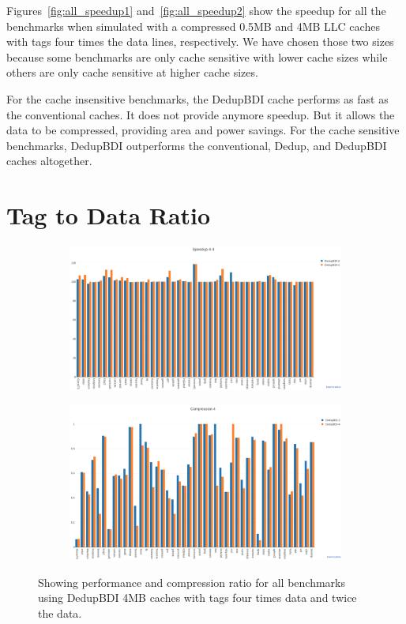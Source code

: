 Figures~\ref{fig:all_speedup1} and~\ref{fig:all_speedup2} show the speedup for all the benchmarks when simulated with a compressed 0.5MB and 4MB LLC caches with tags four times the data lines, respectively. We have chosen those two sizes because some benchmarks are only cache sensitive with lower cache sizes while others are only cache sensitive at higher cache sizes.\par
For the cache insensitive benchmarks, the DedupBDI cache performs as fast as the conventional caches. It does not provide anymore speedup. But it allows the data to be compressed, providing area and power savings. For the cache sensitive benchmarks, DedupBDI outperforms the conventional, Dedup, and DedupBDI caches altogether.

\section{Tag to Data Ratio}
\label{sec:tagratio}
\begin{figure}
    \begin{subfigure}{\textwidth}
        \includegraphics[width=\textwidth]{compare-speedup.png}
    \end{subfigure}
    \begin{subfigure}{\textwidth}
        \includegraphics[width=\textwidth]{compare-compression.png}
    \end{subfigure}
    \caption[All benchmarks: Tag Ratio]{Showing performance and compression ratio for all benchmarks using DedupBDI 4MB caches with tags four times data and twice the data.}
    \label{fig:all_compare}
\end{figure}
